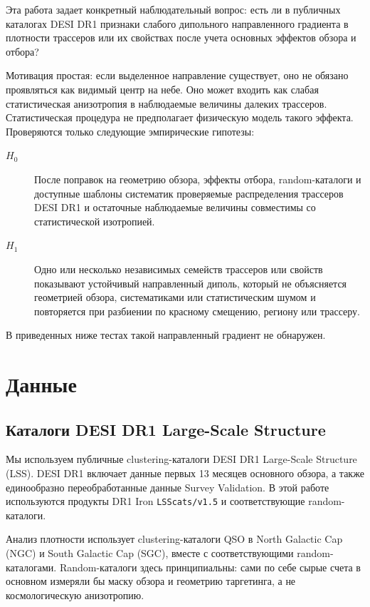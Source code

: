 \documentclass[11pt]{article}
\begin{document}
Эта работа задает конкретный наблюдательный вопрос: есть ли в публичных каталогах DESI DR1 признаки слабого дипольного направленного градиента в плотности трассеров или их свойствах после учета основных эффектов обзора и отбора?

Мотивация простая: если выделенное направление существует, оно не обязано проявляться как видимый центр на небе. Оно может входить как слабая статистическая анизотропия в наблюдаемые величины далеких трассеров. Статистическая процедура не предполагает физическую модель такого эффекта. Проверяются только следующие эмпирические гипотезы:

\begin{description}
    \item[$H_0$] После поправок на геометрию обзора, эффекты отбора, random-каталоги и доступные шаблоны систематик проверяемые распределения трассеров DESI DR1 и остаточные наблюдаемые величины совместимы со статистической изотропией.
    \item[$H_1$] Одно или несколько независимых семейств трассеров или свойств показывают устойчивый направленный диполь, который не объясняется геометрией обзора, систематиками или статистическим шумом и повторяется при разбиении по красному смещению, региону или трассеру.
\end{description}

В приведенных ниже тестах такой направленный градиент не обнаружен.

\section{Данные}

\subsection{Каталоги DESI DR1 Large-Scale Structure}

Мы используем публичные clustering-каталоги DESI DR1 Large-Scale Structure (LSS). DESI DR1 включает данные первых 13 месяцев основного обзора, а также единообразно переобработанные данные Survey Validation. В этой работе используются продукты DR1 Iron \texttt{LSScats/v1.5} и соответствующие random-каталоги.

Анализ плотности использует clustering-каталоги QSO в North Galactic Cap (NGC) и South Galactic Cap (SGC), вместе с соответствующими random-каталогами. Random-каталоги здесь принципиальны: сами по себе сырые счета в основном измеряли бы маску обзора и геометрию таргетинга, а не космологическую анизотропию.
\end{document}
